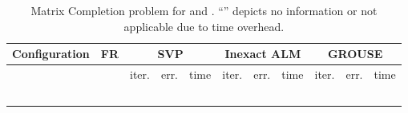 \documentclass[twocolumn]{svjour3}
\begin{document}
\begin{table*} [!htp]
\caption{Matrix Completion problem for  and . ``'' depicts no information or not applicable due to time overhead.} {\label{table:4}}
\begin{center}
\begin{tabular}{|c|c|c|c|c|c|c|c|c|c|c|c|c|c}
\multicolumn{4}{c|}{Configuration} & FR & \multicolumn{3}{|c|}{SVP} & \multicolumn{3}{|c|}{Inexact ALM} & \multicolumn{3}{|c}{GROUSE} \\
\hline \hline
\multicolumn{1}{c}{}  & \multicolumn{1}{c}{} & \multicolumn{1}{c}{} & \multicolumn{1}{c|}{} & & 
\multicolumn{1}{|c}{\rm{iter.}} & \multicolumn{1}{c}{\rm{err.}} & \multicolumn{1}{c|}{\rm{time}} &
\multicolumn{1}{|c}{\rm{iter.}} & \multicolumn{1}{c}{\rm{err.}} & \multicolumn{1}{c|}{\rm{time}} &
\multicolumn{1}{|c}{\rm{iter.}} & \multicolumn{1}{c}{\rm{err.}} & \multicolumn{1}{c}{\rm{time}} \\
\hline\hline
\multicolumn{1}{c}{} & \multicolumn{1}{c}{} & \multicolumn{1}{c}{} & \multicolumn{1}{c|}{} &  & 
\multicolumn{1}{|c}{} & \multicolumn{1}{c}{} & \multicolumn{1}{c|}{} &
\multicolumn{1}{|c}{} & \multicolumn{1}{c}{} & \multicolumn{1}{c|}{} &
\multicolumn{1}{|c}{} & \multicolumn{1}{c}{} & \multicolumn{1}{c}{} \\
\hline
\multicolumn{1}{c}{} & \multicolumn{1}{c}{} & \multicolumn{1}{c}{} & \multicolumn{1}{c|}{} &  & 
\multicolumn{1}{|c}{} & \multicolumn{1}{c}{} & \multicolumn{1}{c|}{} &
\multicolumn{1}{|c}{} & \multicolumn{1}{c}{} & \multicolumn{1}{c|}{} &
\multicolumn{1}{|c}{} & \multicolumn{1}{c}{} & \multicolumn{1}{c}{} \\
\hline
\multicolumn{1}{c}{} & \multicolumn{1}{c}{} & \multicolumn{1}{c}{} & \multicolumn{1}{c|}{} &  & 
\multicolumn{1}{|c}{} & \multicolumn{1}{c}{} & \multicolumn{1}{c|}{} &
\multicolumn{1}{|c}{} & \multicolumn{1}{c}{} & \multicolumn{1}{c|}{} &
\multicolumn{1}{|c}{} & \multicolumn{1}{c}{} & \multicolumn{1}{c}{} \\
\hline
\multicolumn{1}{c}{} & \multicolumn{1}{c}{} & \multicolumn{1}{c}{} & \multicolumn{1}{c|}{} &  & 
\multicolumn{1}{|c}{} & \multicolumn{1}{c}{} & \multicolumn{1}{c|}{} &
\multicolumn{1}{|c}{} & \multicolumn{1}{c}{} & \multicolumn{1}{c|}{} &
\multicolumn{1}{|c}{} & \multicolumn{1}{c}{} & \multicolumn{1}{c}{} \\
\hline
\multicolumn{1}{c}{} & \multicolumn{1}{c}{} & \multicolumn{1}{c}{} & \multicolumn{1}{c|}{} &  & 
\multicolumn{1}{|c}{} & \multicolumn{1}{c}{} & \multicolumn{1}{c|}{} &
\multicolumn{1}{|c}{} & \multicolumn{1}{c}{} & \multicolumn{1}{c|}{} &

\end{tabular}
\end{center}
\end{table*}
\end{document}
